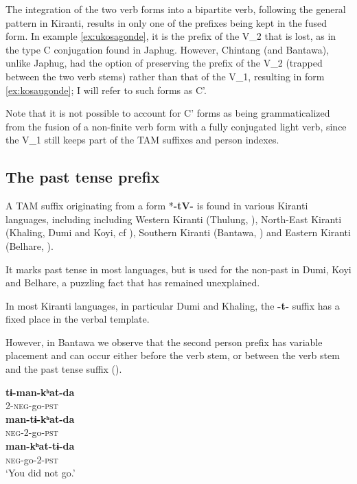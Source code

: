 \documentclass[oneside,a4paper,11pt]{article}
\newcommand{\ipa}[1]{{\phon\textbf{#1}}}
\begin{document}
The integration of the two verb forms into a bipartite verb, following the general pattern in Kiranti, results in only one of the prefixes being kept in the fused form. In example \ref{ex:ukosagonde}, it is the prefix of the V_2 that is lost, as in the type C conjugation found in Japhug. However, Chintang (and Bantawa), unlike Japhug, had the option of preserving the prefix of the V_2 (trapped between the two verb stems) rather than that of the V_1, resulting in form \ref{ex:kosaugonde}; I will refer to such forms as C'.

Note that it is not possible to account for C' forms as being grammaticalized from the fusion of a non-finite verb form with a fully conjugated light verb, since the V_1 still keeps part of the TAM suffixes and person indexes.



\subsection{The past tense prefix} \label{sec:pst}
A TAM suffix originating from a form *\ipa{-tV-} is found in various Kiranti languages, including including Western Kiranti (Thulung, \citealt{lahaussois03}), North-East Kiranti (Khaling, Dumi and Koyi, cf \citealt{driem93dumi, lahaussois09, jacques12khaling}), Southern Kiranti (Bantawa, \citealt{doornenbal09}) and Eastern Kiranti (Belhare, \citealt[551]{bickel03belhare}).

It marks past tense in most languages, but is used for the non-past in Dumi, Koyi and Belhare, a puzzling fact that has remained unexplained.

In most Kiranti languages, in particular Dumi and Khaling, the \ipa{-t-} suffix has a fixed place in the verbal template. 

However, in Bantawa we observe that the second person prefix has variable placement and can occur either before the verb stem, or between the verb stem and the past tense suffix (\citealt[171]{doornenbal09}).

\begin{exe}
\ex \label{ex:timankhatda}
\gll 
\ipa{tɨ-man-kʰat-da} \\
2-\textsc{neg}-go-\textsc{pst} \\
\ex
\gll 
\ipa{man-tɨ-kʰat-da} \\
\textsc{neg}-2-go-\textsc{pst} \\
\ex 
\gll 
\ipa{man-kʰat-tɨ-da} \\
\textsc{neg}-go-2-\textsc{pst} \\
\glt `You did not go.'
\end{exe}
\end{document}
